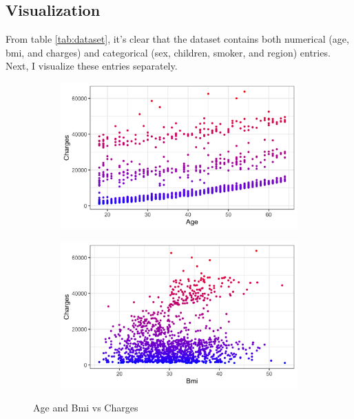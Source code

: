 \documentclass{article}
\begin{document}
\subsection{Visualization}
From table \ref{tab:dataset}, it's clear that the dataset contains both numerical (age, bmi, and charges) and categorical (sex, children, smoker, and region) entries. Next, I visualize these entries separately.
\begin{figure}[!ht]
	\centering
	
	\begin{subfigure}{0.45\textwidth}
		\centering
		\includegraphics[width=\linewidth]{images/age_charges.png}
		\label{fig:age_charges}
	\end{subfigure}
	\hspace{0.05\textwidth} %
	\begin{subfigure}{0.45\textwidth}
		\centering
		\includegraphics[width=\linewidth]{images/bmi_charges.png}
		\label{fig:bmi_charges}
	\end{subfigure}

	\caption{Age and Bmi vs Charges}
	\label{fig:age_bmi_charges}
\end{figure}
\end{document}
